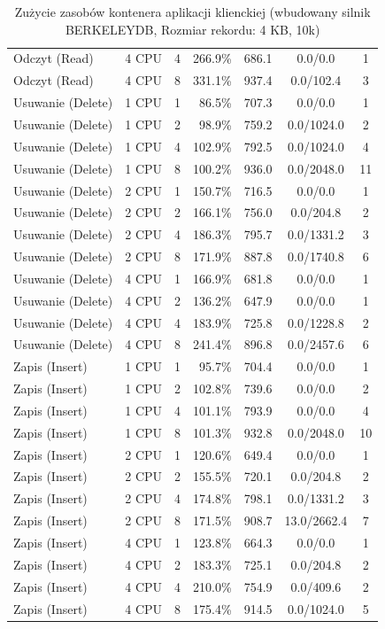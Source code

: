 \begin{table}[ht]
{\begin{tabular}{llcrrcc}
Odczyt (Read) & 4 CPU & 4 & 266.9\% & 686.1 & 0.0/0.0 & 1 \\
Odczyt (Read) & 4 CPU & 8 & 331.1\% & 937.4 & 0.0/102.4 & 3 \\
Usuwanie (Delete) & 1 CPU & 1 & 86.5\% & 707.3 & 0.0/0.0 & 1 \\
Usuwanie (Delete) & 1 CPU & 2 & 98.9\% & 759.2 & 0.0/1024.0 & 2 \\
Usuwanie (Delete) & 1 CPU & 4 & 102.9\% & 792.5 & 0.0/1024.0 & 4 \\
Usuwanie (Delete) & 1 CPU & 8 & 100.2\% & 936.0 & 0.0/2048.0 & 11 \\
Usuwanie (Delete) & 2 CPU & 1 & 150.7\% & 716.5 & 0.0/0.0 & 1 \\
Usuwanie (Delete) & 2 CPU & 2 & 166.1\% & 756.0 & 0.0/204.8 & 2 \\
Usuwanie (Delete) & 2 CPU & 4 & 186.3\% & 795.7 & 0.0/1331.2 & 3 \\
Usuwanie (Delete) & 2 CPU & 8 & 171.9\% & 887.8 & 0.0/1740.8 & 6 \\
Usuwanie (Delete) & 4 CPU & 1 & 166.9\% & 681.8 & 0.0/0.0 & 1 \\
Usuwanie (Delete) & 4 CPU & 2 & 136.2\% & 647.9 & 0.0/0.0 & 1 \\
Usuwanie (Delete) & 4 CPU & 4 & 183.9\% & 725.8 & 0.0/1228.8 & 2 \\
Usuwanie (Delete) & 4 CPU & 8 & 241.4\% & 896.8 & 0.0/2457.6 & 6 \\
Zapis (Insert) & 1 CPU & 1 & 95.7\% & 704.4 & 0.0/0.0 & 1 \\
Zapis (Insert) & 1 CPU & 2 & 102.8\% & 739.6 & 0.0/0.0 & 2 \\
Zapis (Insert) & 1 CPU & 4 & 101.1\% & 793.9 & 0.0/0.0 & 4 \\
Zapis (Insert) & 1 CPU & 8 & 101.3\% & 932.8 & 0.0/2048.0 & 10 \\
Zapis (Insert) & 2 CPU & 1 & 120.6\% & 649.4 & 0.0/0.0 & 1 \\
Zapis (Insert) & 2 CPU & 2 & 155.5\% & 720.1 & 0.0/204.8 & 2 \\
Zapis (Insert) & 2 CPU & 4 & 174.8\% & 798.1 & 0.0/1331.2 & 3 \\
Zapis (Insert) & 2 CPU & 8 & 171.5\% & 908.7 & 13.0/2662.4 & 7 \\
Zapis (Insert) & 4 CPU & 1 & 123.8\% & 664.3 & 0.0/0.0 & 1 \\
Zapis (Insert) & 4 CPU & 2 & 183.3\% & 725.1 & 0.0/204.8 & 2 \\
Zapis (Insert) & 4 CPU & 4 & 210.0\% & 754.9 & 0.0/409.6 & 2 \\
Zapis (Insert) & 4 CPU & 8 & 175.4\% & 914.5 & 0.0/1024.0 & 5 \\
\bottomrule
\end{tabular}%
}
\caption{Zużycie zasobów kontenera aplikacji klienckiej (wbudowany silnik BERKELEYDB, Rozmiar rekordu: 4 KB, 10k)}
\label{tab:resources_berkeleydb_medium_10000}
\end{table}
